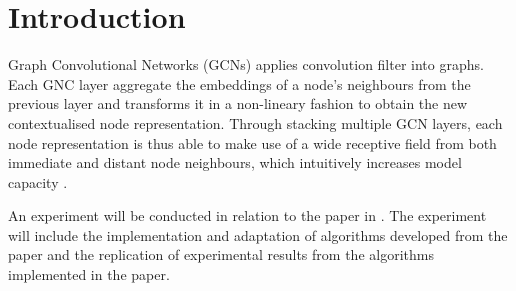 \chapter{Introduction}
Graph Convolutional Networks (GCNs) applies convolution filter into graphs. Each GNC layer aggregate the embeddings of a node's neighbours from the previous layer and transforms it in a non-lineary fashion to obtain the new contextualised node representation. Through stacking multiple GCN layers, each node representation is thus able to make use of a wide receptive field from both immediate and distant node neighbours, which intuitively increases model capacity \cite{assigned_paper_zou2019layer}. 

An experiment will be conducted in relation to the paper in \cite{assigned_paper_zou2019layer}. The experiment will include the implementation and adaptation of algorithms developed from the paper and the replication of experimental results from the algorithms implemented in the paper.
